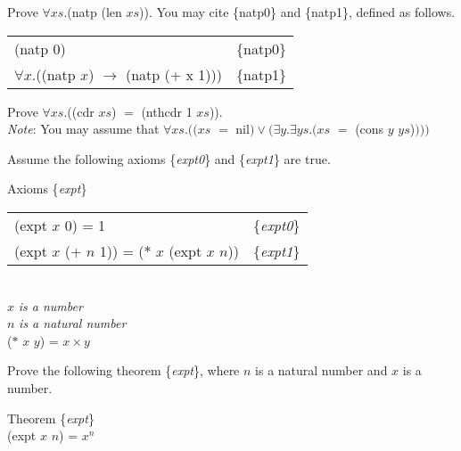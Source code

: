 \begin{ExerciseList}

\Exercise Prove $\forall xs.$(natp (len $xs$)).
You may cite
\{natp0\} and \{natp1\},
defined as follows.
\begin{center}
\begin{tabular}{ll}
(natp $0$)                                            & \{natp0\}\\
$\forall x.$((natp $x$) $\rightarrow$ (natp (+ x 1))) & \{natp1\}\\
\end{tabular}
\end{center}

\Exercise Prove $\forall xs.$((cdr $xs$) $=$ (nthcdr 1 $xs$)).\\
\emph{Note}: You may assume that $\forall xs.((xs$ $=$ nil$) \vee (\exists y.\exists ys.(xs$ $=$ (cons $y$ $ys$)$)))$

\Exercise Assume the following axioms \{\emph{expt0}\} and \{\emph{expt1}\} are true.
\begin{samepage}
\label{expt-equations}
\begin{center}
Axioms \{\emph{expt}\} \\
\begin{tabular}{ll}
(expt $x$ 0) = 1                                & \{\emph{expt0}\} \\
(expt $x$ (+ $n$ 1)) = ($*$ $x$ (expt $x$ $n$)) & \{\emph{expt1}\} \\
\hline
\end{tabular}
\\ $x$ \emph{is a number}
\\ $n$ \emph{is a natural number}
\\ ($*$ $x$ $y$) = $x \times y$
\end{center}
\end{samepage}
Prove the following theorem \{\emph{expt}\}, where $n$ is a natural number and $x$ is a number.
\begin{samepage}
\label{expt-thm}
\begin{center}
Theorem \{\emph{expt}\} \\
(expt $x$ $n$) = $x^n$
\end{center}
\end{samepage}

\end{ExerciseList}

